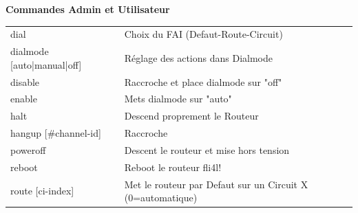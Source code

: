   \begin{table}
    \textbf{Commandes Admin et Utilisateur}

    \vspace{1ex}
    \begin{tabular}{lp{9cm}}

      dial                      &    Choix du FAI (Defaut-Route-Circuit) \\
      dialmode [auto|manual|off]&    Réglage des actions dans Dialmode \\
      disable                   &    Raccroche et place dialmode sur "off" \\
      enable                    &    Mets dialmode sur "auto" \\
      halt                      &    Descend proprement le Routeur \\
      hangup [\#channel-id]     &    Raccroche \\
      poweroff                  &    Descent le routeur et mise hors tension \\
      reboot                    &    Reboot le routeur fli4l! \\
      route [ci-index]          &    Met le routeur par Defaut sur un Circuit X (0=automatique) \\
    \end{tabular}
  \end{table}


